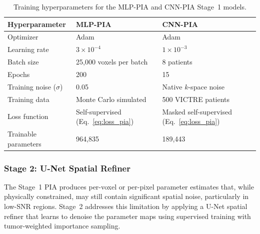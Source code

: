 \documentclass[12pt]{article}
\begin{document}
\begin{table}[h]
\centering
\caption{Training hyperparameters for the MLP-PIA and CNN-PIA Stage~1 models.}
\label{tab:training_hyperparams}
\begin{tabular}{lll}
\toprule
\textbf{Hyperparameter} & \textbf{MLP-PIA} & \textbf{CNN-PIA} \\
\midrule
Optimizer             & Adam                          & Adam \\
Learning rate         & $3 \times 10^{-4}$            & $1 \times 10^{-3}$ \\
Batch size            & 25,000 voxels per batch       & 8 patients \\
Epochs                & 200                           & 15 \\
Training noise ($\sigma$) & 0.05                      & Native $k$-space noise \\
Training data         & Monte Carlo simulated         & 500 VICTRE patients \\
Loss function         & Self-supervised (Eq.~\ref{eq:loss_pia}) & Masked self-supervised (Eq.~\ref{eq:loss_pia}) \\
Trainable parameters  & 964,835                       & 189,443 \\
\bottomrule
\end{tabular}
\end{table}

\subsubsection{Stage 2: U-Net Spatial Refiner}

The Stage~1 PIA produces per-voxel or per-pixel parameter estimates that, while physically constrained, may still contain significant spatial noise, particularly in low-SNR regions. Stage~2 addresses this limitation by applying a U-Net spatial refiner that learns to denoise the parameter maps using supervised training with tumor-weighted importance sampling.
\end{document}
